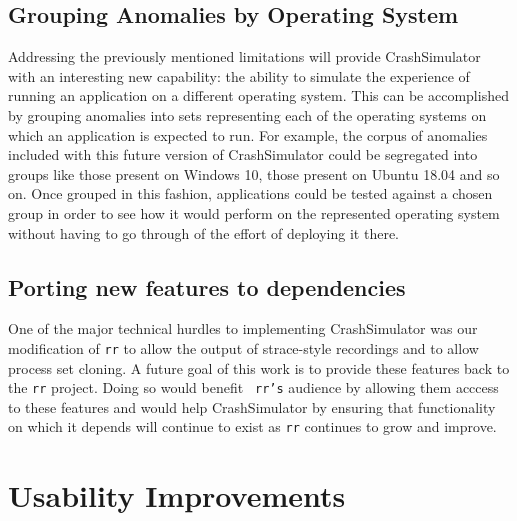 \documentclass[twocolumn]{article}
\begin{document}
\subsection{Grouping Anomalies by Operating System}

Addressing the previously mentioned limitations will provide CrashSimulator
with an interesting new capability: the ability to simulate the experience
of running an application on a different operating system.  This can be
accomplished by grouping anomalies into sets representing each of the
operating systems on which an application is expected to run. For example,
the corpus of anomalies included with this future version of CrashSimulator
could be segregated into groups like those present on Windows 10, those
present on Ubuntu 18.04 and so on.  Once grouped in this fashion,
applications could be tested against a chosen group in order to see how it
would perform on the represented operating system without having to go
through of the effort of deploying it there.


\subsection{Porting new features to dependencies}

One of the major technical hurdles to implementing CrashSimulator was our
modification of {\tt rr} to allow the output of strace-style recordings and
to allow process set cloning.  A future goal of this work is to provide
these features back to the {\tt rr} project.  Doing so would benefit {\tt
rr's} audience by allowing them acccess to these features
and would help CrashSimulator by ensuring that functionality on which it
depends will continue to exist as {\tt rr} continues to grow and improve.


\section{Usability Improvements}
\end{document}
